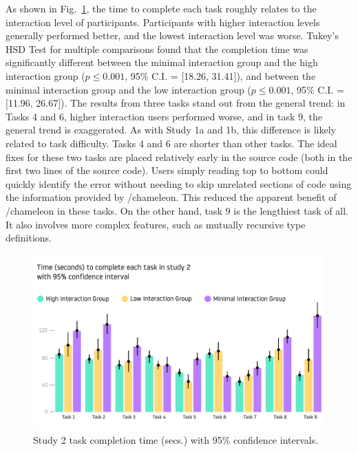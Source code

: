 As shown in  Fig.~\ref{fig:r4-analysis}, the time to complete each task roughly relates to the interaction level of participants. Participants with higher interaction levels generally performed better, and the lowest interaction level was worse. Tukey’s HSD Test for multiple comparisons found that the completion time was significantly different between the minimal interaction group and the high interaction group ($p \le 0.001$, 95\% C.I. = [18.26, 31.41]), and between the minimal interaction group and the low interaction group ($p \le 0.001$, 95\% C.I. = [11.96, 26.67]). The results from three tasks stand out from the general trend: in Tasks 4 and 6, higher interaction users performed worse, and in task 9, the general trend is exaggerated. As with Study 1a and 1b, this difference is likely related to task difficulty. Tasks 4 and 6 are shorter than other tasks. The ideal fixes for these two tasks are placed relatively early in the source code (both in the first two lines of the source code). Users simply reading top to bottom could quickly identify the error without needing to skip unrelated sections of code using the information provided by /chameleon{}. This reduced the apparent benefit of /chameleon{} in these tasks. On the other hand, task 9 is the lengthiest task of all. It also involves more complex features, such as mutually recursive type definitions.

\begin{figure}
    \centering
    \includegraphics[width=\linewidth,trim=0mm 15mm 0mm 50mm,clip]{images/user-study-2.pdf}
    \caption{Study 2 task completion time (secs.) with 95\% confidence intervals.}
    \label{fig:r4-analysis}
\end{figure}


